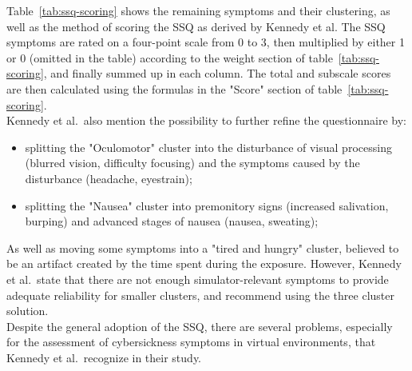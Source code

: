 Table~\ref{tab:ssq-scoring} shows the remaining symptoms and their clustering, as well as the method of scoring the
SSQ as derived by Kennedy et al.
The SSQ symptoms are rated on a four-point scale from 0 to 3, then multiplied by either 1 or 0 (omitted in the table)
according to the weight section of table~\ref{tab:ssq-scoring}, and finally summed up in each column.
The total and subscale scores are then calculated using the formulas in the "Score" section of
table~\ref{tab:ssq-scoring}.
\\
Kennedy et al.\ also mention the possibility to further refine the questionnaire by:
\begin{itemize}
    \item splitting the "Oculomotor" cluster into the disturbance of visual processing (blurred vision, difficulty
    focusing) and the symptoms caused by the disturbance (headache, eyestrain);
    \item splitting the "Nausea" cluster into premonitory signs (increased salivation, burping) and advanced stages
    of nausea (nausea, sweating);
\end{itemize}
As well as moving some symptoms into a "tired and hungry" cluster, believed to be an artifact created by the time
spent during the exposure.
However, Kennedy et al.\ state that there are not enough simulator-relevant symptoms to provide adequate reliability
for smaller clusters, and recommend using the three cluster solution.
\\
Despite the general adoption of the SSQ, there are several problems, especially for the assessment of
cybersickness symptoms in virtual environments, that Kennedy et al.\ recognize in their study.
